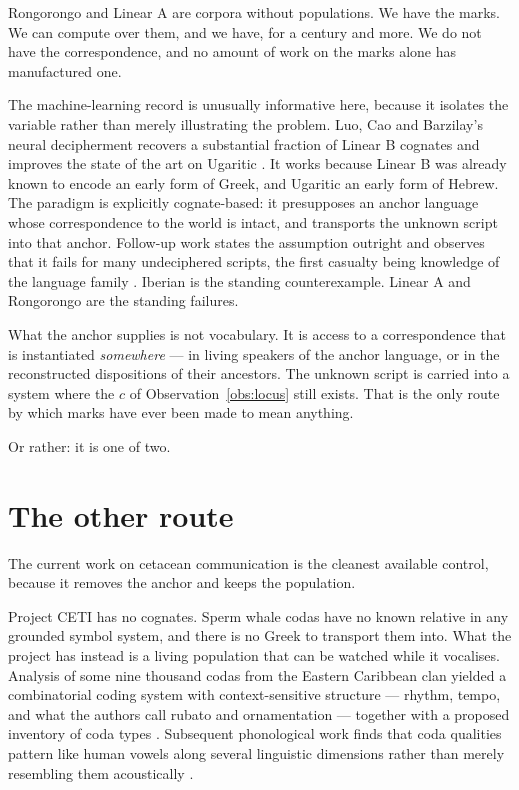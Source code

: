 Rongorongo and Linear A are corpora without populations.
We have the marks.
We can compute over them, and we have, for a century and more.
We do not have the correspondence, and no amount of work on the
marks alone has manufactured one.

The machine-learning record is unusually informative here, because
it isolates the variable rather than merely illustrating the
problem.
Luo, Cao and Barzilay's neural decipherment recovers a substantial
fraction of Linear B cognates and improves the state of the art on
Ugaritic \cite{luo2019}.
It works because Linear B was already known to encode an early form
of Greek, and Ugaritic an early form of Hebrew.
The paradigm is explicitly cognate-based: it presupposes an anchor
language whose correspondence to the world is intact, and
transports the unknown script into that anchor.
Follow-up work states the assumption outright and observes that it
fails for many undeciphered scripts, the first casualty being
knowledge of the language family \cite{luo2021}.
Iberian is the standing counterexample.
Linear A and Rongorongo are the standing failures.

What the anchor supplies is not vocabulary.
It is access to a correspondence that is instantiated
\emph{somewhere} --- in living speakers of the anchor language, or
in the reconstructed dispositions of their ancestors.
The unknown script is carried into a system where the $c$ of
Observation~\ref{obs:locus} still exists.
That is the only route by which marks have ever been made to mean
anything.

Or rather: it is one of two.

\section{The other route}
\label{sec:whales}

The current work on cetacean communication is the cleanest
available control, because it removes the anchor and keeps the
population.

Project CETI has no cognates.
Sperm whale codas have no known relative in any grounded symbol
system, and there is no Greek to transport them into.
What the project has instead is a living population that can be
watched while it vocalises.
Analysis of some nine thousand codas from the Eastern Caribbean
clan yielded a combinatorial coding system with context-sensitive
structure --- rhythm, tempo, and what the authors call rubato and
ornamentation --- together with a proposed inventory of coda types
\cite{sharma2024}.
Subsequent phonological work finds that coda qualities pattern like
human vowels along several linguistic dimensions rather than merely
resembling them acoustically \cite{begus2026}.

